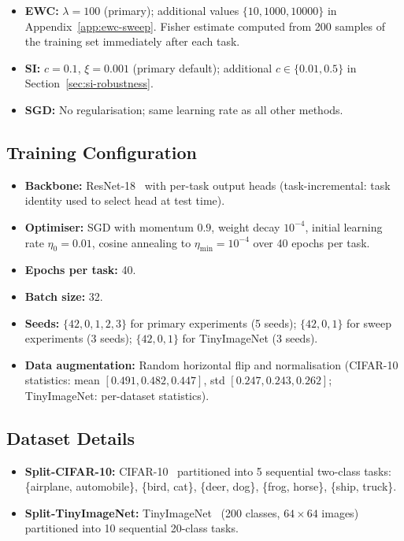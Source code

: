 \documentclass[10pt,a4paper]{article}
\begin{document}
\begin{itemize}
  \item \textbf{EWC:} $\lambda = 100$ (primary); additional values
        $\{10, 1000, 10000\}$ in Appendix~\ref{app:ewc-sweep}.
        Fisher estimate computed from 200 samples of the training set immediately
        after each task.
  \item \textbf{SI:} $c = 0.1$, $\xi = 0.001$ (primary default);
        additional $c \in \{0.01, 0.5\}$ in Section~\ref{sec:si-robustness}.
  \item \textbf{SGD:} No regularisation; same learning rate as all other methods.
\end{itemize}

\subsection{Training Configuration}

\begin{itemize}
  \item \textbf{Backbone:} ResNet-18~\cite{He2016} with per-task output heads
        (task-incremental: task identity used to select head at test time).
  \item \textbf{Optimiser:} SGD with momentum $0.9$, weight decay $10^{-4}$,
        initial learning rate $\eta_0 = 0.01$, cosine annealing to $\eta_\text{min}
        = 10^{-4}$ over 40 epochs per task.
  \item \textbf{Epochs per task:} 40.
  \item \textbf{Batch size:} 32.
  \item \textbf{Seeds:} $\{42, 0, 1, 2, 3\}$ for primary experiments (5 seeds);
        $\{42, 0, 1\}$ for sweep experiments (3 seeds);
        $\{42, 0, 1\}$ for TinyImageNet (3 seeds).
  \item \textbf{Data augmentation:} Random horizontal flip and normalisation
        (CIFAR-10 statistics: mean $[0.491, 0.482, 0.447]$, std $[0.247, 0.243, 0.262]$;
        TinyImageNet: per-dataset statistics).
\end{itemize}

\subsection{Dataset Details}

\begin{itemize}
  \item \textbf{Split-CIFAR-10:} CIFAR-10~\cite{Krizhevsky2009} partitioned into 5
        sequential two-class tasks: \{airplane, automobile\}, \{bird, cat\}, \{deer, dog\},
        \{frog, horse\}, \{ship, truck\}.
  \item \textbf{Split-TinyImageNet:} TinyImageNet~\cite{Le2015} (200 classes,
        $64 \times 64$ images) partitioned into 10 sequential 20-class tasks.
\end{itemize}
\end{document}
